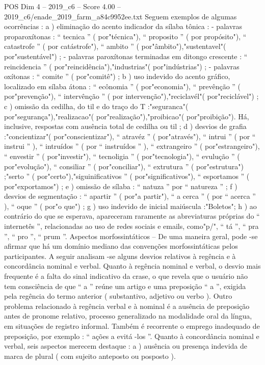 \begin{textsample}{POS Dim 4 – 2019\_c6 – Score 4.00 – 2019\_c6/enade\_2019\_farm\_a84c9952ee.txt}
Seguem exemplos de algumas ocorrências : a ) eliminação do acento indicador da sílaba tônica : - palavras proparoxítonas : “ tecnica ” ( por"técnica"), “ proposito ” ( por propósito"), “ catastrofe ” ( por catástrofe"), “ ambito ” ( por"âmbito"),"sustentavel"( por"sustentável") ; - palavras paroxítonas terminadas em ditongo crescente : “ reincidencia ” ( por"reincidência"),"industrias"( por"indústrias") ; - palavras oxítonas : “ comite ” ( por"comitê") ; b ) uso indevido do acento gráfico, localizado em sílaba átona : “ ecônomia ” ( por"economia"), “ prevênção ” ( por"prevenção"), “ intervênção ” ( por intervenção"),"reciclavél"( por"reciclável") ; c ) omissão da cedilha, do til e do traço do T :"seguranca"( por"segurança"),"realizacao"( por"realização"),"proibicao"( por"proibição").
Há, inclusive, respostas com ausência total de cedilha ou til ; d ) desvios de grafia :"concientizar"( por"conscientizar"), “ atravéz ” ( por"através"), “ intrui ” ( por “ instrui ” ), “ intruídos ” ( por “ instruídos ” ), “ extrangeiro ” ( por"estrangeiro"), “ envestir ” ( por"investir"), “ tecnoligia ” ( por"tecnologia"), “ evulução ” ( por"evolução"), “ consiliar ” ( por"conciliar"), “ extrutura ” ( por"estrutura") ;"serto ” ( por"certo"),"siguinificativos ” ( por"significativos"), “ esportamos ” ( por"exportamos") ; e ) omissão de sílaba : “ natuza ” por “ natureza ” ; f ) desvios de segmentação : “ apartir ” ( por"a partir"), “ a cerca ” ( por “ acerca ” ), “ oque ” ( por"o que") ; g ) uso indevido de inicial maiúscula :"Boletos"; h ) ao contrário do que se esperava, apareceram raramente as abreviaturas próprias do “ internetês ”, relacionadas ao uso de redes sociais e emails, como"p/", “ tá ”, “ pra ”, “ pro ”, “ prum ”.
Aspectos morfossintáticos – De uma maneira geral, pode -se afirmar que há um domínio mediano das convenções morfossintáticas pelos participantes.
A seguir analisam -se alguns desvios relativos à regência e à concordância nominal e verbal.
Quanto à regência nominal e verbal, o desvio mais frequente é a falta do sinal indicativo da crase, o que revela que o usuário não tem consciência de que “ a ” reúne um artigo e uma preposição “ a ”, exigida pela regência do termo anterior ( substantivo, adjetivo ou verbo ).
Outro problema relacionado à regência verbal e à nominal é a ausência de preposição antes de pronome relativo, processo generalizado na modalidade oral da língua, em situações de registro informal.
Também é recorrente o emprego inadequado de preposição, por exemplo : “ ações a evitá -los ”.
Quanto à concordância nominal e verbal, seis aspectos merecem destaque : a ) ausência ou presença indevida de marca de plural ( com sujeito anteposto ou posposto ).

\end{textsample}
